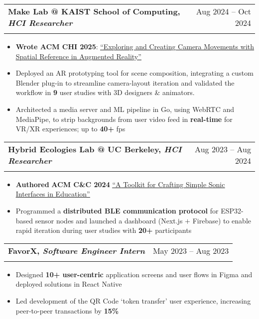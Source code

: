 \documentclass[letterpaper,11pt]{article}
\makeatletter
\newcommand{\resumeItem}[1]{
  \item\small{
    {#1 \vspace{2pt}}
  }
}
\newcommand{\resumeSubheading}[4]{
  \vspace{-1pt}\item
    \begin{tabular*}{0.97\textwidth}[t]{l@{\extracolsep{\fill}}r}
      \textbf{#1} & #2 \\
      \textit{\small#3} & \textit{\small #4} \\
    \end{tabular*}\vspace{-5pt}
}
\newcommand{\resumeSubSubheading}[2]{
    \item
    \begin{tabular*}{0.97\textwidth}{l@{\extracolsep{\fill}}r}
      \textit{\small#1} & \textit{\small #2} \\
    \end{tabular*}\vspace{-5pt}
}
\newcommand{\resumeItemListStart}{\begin{itemize}}
\newcommand{\resumeItemListEnd}{\end{itemize}\vspace{-5pt}}
\makeatother
\begin{document}
    \resumeSubheading
      {Make Lab @ KAIST School of Computing, \textnormal{\emph{HCI Researcher}}}{Aug 2024 -- Oct 2024}
      {}{}
      \vspace{-15pt}
      \resumeItemListStart
        \resumeItem{\textbf{Wrote ACM CHI 2025}: \underline{\href{https://dl.acm.org/doi/10.1145/3706599.3721180}{``Exploring and Creating Camera Movements with Spatial Reference in Augmented Reality''}}}
        \resumeItem{Deployed an AR prototyping tool for scene composition, integrating a custom Blender plug-in to streamline camera-layout iteration and validated the workflow in \textbf{9} user studies with 3D designers \& animators.}
        \resumeItem{Architected a media server and ML pipeline in Go, using WebRTC and MediaPipe, to strip backgrounds from user video feed in \textbf{real-time} for VR/XR experiences; up to \textbf{40+} fps}
      \resumeItemListEnd

    \resumeSubheading
      {Hybrid Ecologies Lab @ UC Berkeley, \textnormal{\emph{HCI Researcher}}}{Aug 2023 -- Aug 2024}
      {}{}
      \vspace{-15pt}
      \resumeItemListStart
      \resumeItem{\textbf{Authored} \textbf{ACM C\&C 2024} \underline{\href{https://dl.acm.org/doi/10.1145/3635636.3664266}{``A Toolkit for Crafting Simple Sonic Interfaces in Education''}}}
      \resumeItem{Programmed a \textbf{distributed BLE communication protocol} for ESP32-based sensor nodes and launched a dashboard (Next.js $+$ Firebase) to enable rapid iteration during user studies with \textbf{20+} participants}
    \resumeItemListEnd


    \resumeSubheading
      {FavorX, \textnormal{\emph{Software Engineer Intern}}}{May 2023 -- Aug 2023}
      {}{}
      \vspace{-15pt}
      \resumeItemListStart
      \resumeItem{Designed \textbf{10+ user-centric} application screens and user flows in Figma and deployed solutions in React Native}
      \resumeItem{Led development of the QR Code `token transfer' user experience, increasing peer-to-peer transactions by \textbf{15\%}}  
      \resumeItemListEnd
\end{document}
